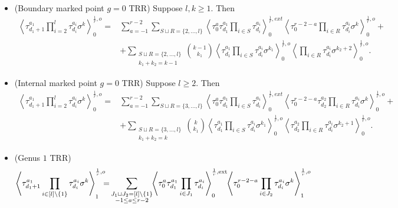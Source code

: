 \documentclass[11pt]{amsart}
\theoremstyle{definition}
\theoremstyle{remark}
\newcommand{\<}{\left<}
\renewcommand{\>}{\right>}
\numberwithin{equation}{section}
\begin{document}
\begin{itemize}
\item[(a)] (Boundary marked point $g=0$ TRR) Suppose $l,k\geq 1$.  Then
\begin{align*}
\< \tau_{d_1+1}^{a_1}\prod_{i=2}^l\tau^{a_i}_{d_i}\sigma^k\>^{\frac{1}{r},o}_0=&
\sum_{a=-1}^{r-2}\sum_{S \sqcup R = \{2,\ldots,l\}}\left\langle \tau_0^{a}\tau_{d_1}^{a_1}\prod_{i \in S}\tau_{d_i}^{a_i}\right\rangle^{\frac{1}{r},{ext}}_0
\left\langle \tau_0^{r-2-a}\prod_{i\in R}\tau^{a_i}_{d_i}\sigma^k\right\rangle^{\frac{1}{r},o}_0+\\
&+\sum_{\substack{S \sqcup R = \{2,\ldots,l\} \\ k_1 + k_2 = k-1}} \binom{k-1}{k_1} \left\langle \tau^{a_1}_{d_1}\prod_{i \in S} \tau^{a_i}_{d_i}\sigma^{k_1}\right\rangle^{\frac{1}{r},o}_0 \left\langle \prod_{i \in R} \tau^{a_i}_{d_i} \sigma^{k_2+2}\right\rangle^{\frac{1}{r}, o}_0.
\end{align*}
\item[(b)] (Internal marked point $g=0$ TRR) Suppose $l\geq 2$.  Then
\begin{align*}
\<\tau_{d_1+1}^{a_1}\prod_{i=2}^l\tau^{a_i}_{d_i}\sigma^k\>^{\frac{1}{r},o}_0=&
\sum_{a=-1}^{r-2}\sum_{S \sqcup R = \{3,\ldots,l\}}\left\langle \tau_0^{a}\tau_{d_1}^{a_1}\prod_{i \in S}\tau_{d_i}^{a_i}\right\rangle^{\frac{1}{r},{ext}}_0
\left\langle \tau_0^{r-2-a}\tau^{a_2}_{d_2}\prod_{i\in R}\tau^{a_i}_{d_i}\sigma^k\right\rangle^{\frac{1}{r},o}_0+\\
&+\sum_{\substack{S \sqcup R = \{3,\ldots,l\} \\ k_1 + k_2 = k}} \binom{k}{k_1} \left\langle \tau^{a_1}_{d_1} \prod_{i \in S} \tau^{a_i}_{d_i}\sigma^{k_1}\right\rangle^{\frac{1}{r},o}_0 \left\langle \tau^{a_2}_{d_2}\prod_{i \in R} \tau^{a_i}_{d_i} \sigma^{k_2+1}\right\rangle^{\frac{1}{r}, o}_0.
\end{align*}
\item[(c)](Genus $1$ TRR)
\begin{equation}
\begin{split}
\left\langle \tau_{d_{1}+1}^{a_1}\prod_{i\in [l]\setminus \{1\}}\tau^{a_i}_{d_i}\sigma^k\right\rangle^{\frac{1}{r},o}_1\hspace{-0.2cm}
=&\sum_{\substack{J_1 \sqcup J_2 = [l]\setminus\{1\}\\ -1\le a \le r-2}}\hspace{-0.1cm}\left\langle \tau_0^{a}\tau_{d_{1}}^{a_{1}}\prod_{i \in J_1}\tau_{d_i}^{a_i}\right\rangle^{\frac{1}{r},\text{ext}}_0
\hspace{-0.1cm}\left\langle \tau_0^{r-2-a}\prod_{i\in J_2}\tau^{a_i}_{d_i}\sigma^k\right\rangle^{\frac{1}{r},o}_1\\

\end{split}
\end{equation}
\end{itemize}
\end{document}
